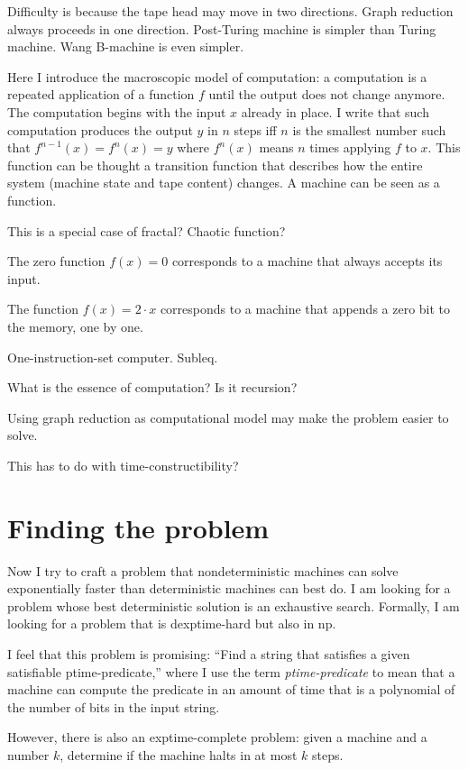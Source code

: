 Difficulty is because the tape head may move in two directions.
Graph reduction always proceeds in one direction.
Post-Turing machine is simpler than Turing machine.
Wang B-machine is even simpler.

Here I introduce the macroscopic model of computation:
a computation is a repeated application of a function $f$
until the output does not change anymore.
The computation begins with the input $x$ already in place.
I write that such computation produces the output $y$
in $n$ steps iff $n$ is the smallest number such that $f^{n-1}(x) = f^n(x) = y$
where $f^n(x)$ means $n$ times applying $f$ to $x$.
This function can be thought a transition function that describes
how the entire system (machine state and tape content) changes.
A machine can be seen as a function.

This is a special case of fractal? Chaotic function?

The zero function $f(x) = 0$ corresponds to a machine
that always accepts its input.

The function $f(x) = 2 \cdot x$ corresponds to a machine
that appends a zero bit to the memory, one by one.

One-instruction-set computer.
Subleq.

What is the essence of computation?
Is it recursion?

Using graph reduction as computational model
may make the problem easier to solve.

This has to do with time-constructibility?

\section{Finding the problem}

Now I try to craft a problem that nondeterministic machines
can solve exponentially faster than deterministic machines can best do.
I am looking for a problem whose best deterministic solution
is an exhaustive search.
Formally, I am looking for a problem that is dexptime-hard but also in np.

I feel that this problem is promising:
``Find a string that satisfies a given satisfiable ptime-predicate,''
where I use the term \emph{ptime-predicate} to mean that
a machine can compute the predicate in an amount of time
that is a polynomial of the number of bits in the input string.

However, there is also an exptime-complete problem:
given a machine and a number $k$, determine if the machine
halts in at most $k$ steps.

